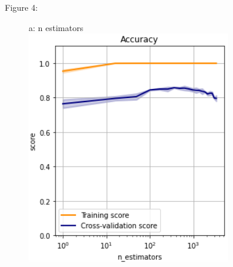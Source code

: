 \documentclass{article}
\begin{document}
\begin{figure}
	\centering
	Figure 4:\\
	\begin{subfigure}{.30\textwidth}
		\centering
		a: n estimators\\
		\includegraphics[width=\linewidth]{poland_xgb_n_estimators_accuracy.png}
		

\end{subfigure}
\end{figure}
\end{document}
